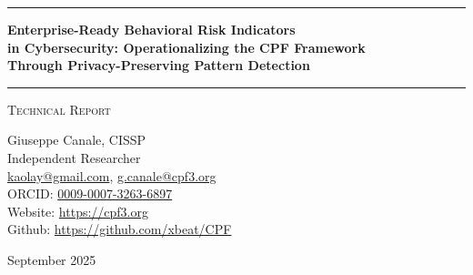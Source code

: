 \documentclass[11pt,a4paper]{article}
\begin{document}
\thispagestyle{empty}
\begin{center}

\vspace*{0.5cm}

\rule{\textwidth}{1.5pt}

\vspace{0.5cm}

{\LARGE \textbf{Enterprise-Ready Behavioral Risk Indicators}}\\[0.3cm]
{\LARGE \textbf{in Cybersecurity: Operationalizing the CPF Framework}}\\[0.3cm]
{\LARGE \textbf{Through Privacy-Preserving Pattern Detection}}

\vspace{0.5cm}

\rule{\textwidth}{1.5pt}

\vspace{0.3cm}

{\large \textsc{Technical Report}}

\vspace{0.5cm}

{\Large Giuseppe Canale, CISSP}\\[0.2cm]
Independent Researcher\\[0.1cm]
\href{mailto:kaolay@gmail.com}{kaolay@gmail.com},
\href{mailto:g.canale@cpf3.org}{g.canale@cpf3.org}\\[0.1cm]
ORCID: \href{https://orcid.org/0009-0007-3263-6897}{0009-0007-3263-6897}\\[0.1cm]
Website: \href{https://cpf3.org}{https://cpf3.org}\\[0.1cm]
Github: \href{https://github.com/xbeat/CPF}{https://github.com/xbeat/CPF}

\vspace{0.8cm}

{\large September 2025}

\vspace{1cm}

\end{center}
\end{document}
